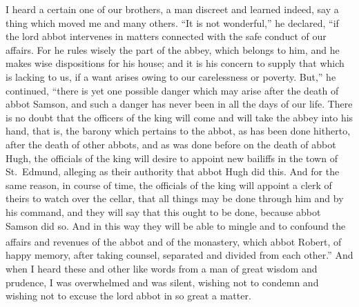 \documentclass{book}
\newcounter{engnote}
\newcommand{\engnotenum}{\textsuperscript{\arabic{engnote}\stepcounter{engnote}}}
\begin{document}
\begin{paracol}{2}
I heard a certain one of our brothers, a man discreet and learned indeed, say a thing which moved me and many others. ``It is not wonderful,'' he declared, ``if the lord abbot intervenes in matters connected with the safe conduct of our affairs. For he rules wisely the part of the abbey, which belongs to him, and he makes wise dispositions for his house; and it is his concern to supply that which is lacking to us, if a want arises owing to our carelessness or poverty. But,'' he continued, ``there is yet one possible danger which may arise after the death of abbot Samson, and such a danger has never been in all the days of our life. There is no doubt that the officers of the king will come and will take the abbey into his hand, that is, the barony which pertains to the abbot, as has been done hitherto, after the death of other abbots, and as was done before on the death of abbot Hugh, the officials of the king will desire to appoint new bailiffs in the town of St.\ Edmund, alleging as their authority that abbot Hugh did this. And for the same reason, in course of time, the officials of the king will appoint a clerk of theirs to watch over the cellar, that all things may be done through him and by his command, and they will say that this ought to be done, because abbot Samson did so. And in this way they will be able to mingle and to confound the affairs and revenues of the abbot and of the monastery, which abbot Robert,\engnotenum{} of happy memory, after taking counsel, separated and divided from each other.'' And when I heard these and other like words from a man of great wisdom and prudence, I was overwhelmed and was silent, wishing not to condemn and wishing not to excuse the lord abbot in so great a matter.

\switchcolumn*


\end{paracol}
\end{document}
